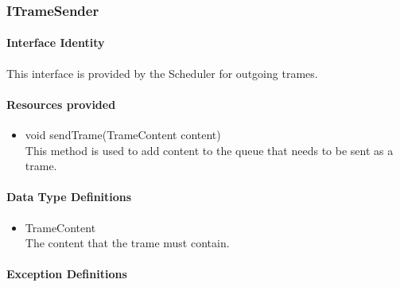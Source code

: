 \subsubsection{ITrameSender}
\paragraph{Interface Identity}
This interface is provided by the Scheduler for outgoing trames.
\paragraph{Resources provided}
\begin{itemize}
	\item{void sendTrame(TrameContent content)}\\
	This method is used to add content to the queue that needs
		to be sent as a trame.
\end{itemize}
\paragraph{Data Type Definitions}
\begin{itemize}
	\item TrameContent\\
	The content that the trame must contain.
\end{itemize}
\paragraph{Exception Definitions}
